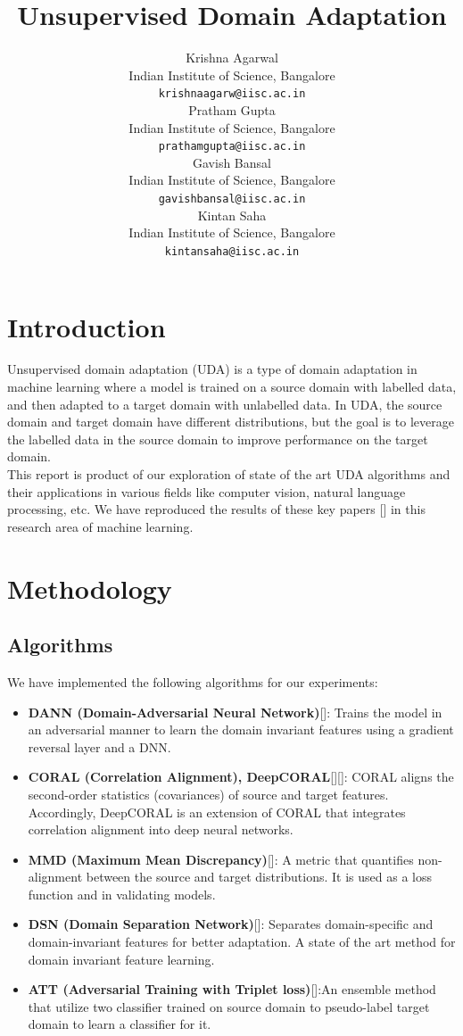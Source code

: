 \documentclass{article}
\title{Unsupervised Domain Adaptation}
\author{ Krishna Agarwal\\%
  Indian Institute of Science, Bangalore\\
  \texttt{krishnaagarw@iisc.ac.in} \\
   \And
  {Pratham Gupta} \\
  Indian Institute of Science, Bangalore\\
  \texttt{prathamgupta@iisc.ac.in} \\
   \And
   {Gavish Bansal} \\
   Indian Institute of Science, Bangalore\\
   \texttt{gavishbansal@iisc.ac.in} \\
   \And
   {Kintan Saha} \\
   Indian Institute of Science, Bangalore\\
   \texttt{kintansaha@iisc.ac.in} \\
}
\begin{document}
\graphicspath{{./images/}}

\maketitle


\begin{abstract}
  
\end{abstract}


\section{Introduction}
Unsupervised domain adaptation (UDA) is a type of domain adaptation in machine learning where a model is trained on a source domain with labelled data, and then adapted to a target domain with unlabelled data.
In UDA, the source domain and target domain have different distributions, but
the goal is to leverage the labelled data in the source domain to improve performance on the target
domain. \\
This report is product of our exploration of state of the art UDA algorithms and their applications in various fields like computer vision, natural language processing, etc. 
We have reproduced the results of these key papers [] in this research area of machine learning.

\section{Methodology}

\subsection{Algorithms}
We have implemented the following algorithms for our experiments:
\begin{itemize}
  \item \textbf{DANN (Domain-Adversarial Neural Network)}[]: Trains the model in an adversarial manner to learn the domain invariant features using a gradient reversal layer and a DNN.
  \item \textbf{CORAL (Correlation Alignment), DeepCORAL}[][]: CORAL aligns the second-order statistics (covariances) of source and target features. Accordingly, DeepCORAL is an extension of CORAL that integrates correlation alignment into deep neural networks.
  \item \textbf{MMD (Maximum Mean Discrepancy)}[]: A metric that quantifies non-alignment between the source and target distributions. It is used as a loss function and in validating models. 
  \item \textbf{DSN (Domain Separation Network)}[]: Separates domain-specific and domain-invariant features for better adaptation. A state of the art method for domain invariant feature learning.
  \item \textbf{ATT (Adversarial Training with Triplet loss)}[]:An ensemble method that utilize two classifier trained on source domain to pseudo-label target domain to learn a classifier for it.
\end{itemize}
\end{document}
